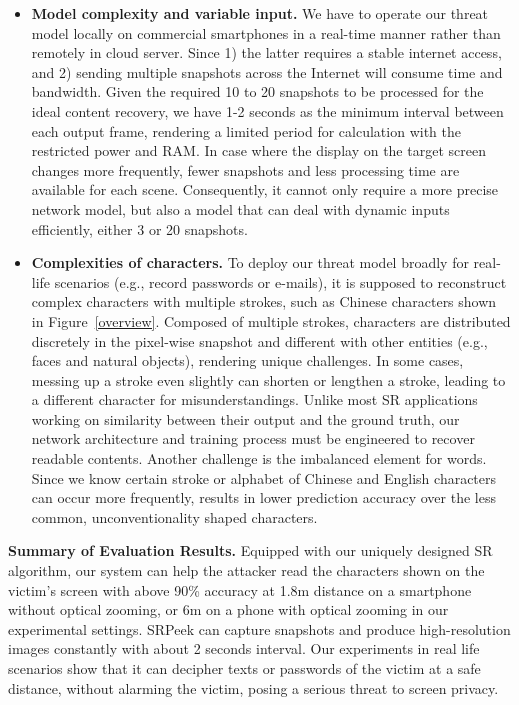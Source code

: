 \begin{itemize}
  \item \textbf{Model complexity and variable input.} We have to operate our threat model locally on commercial smartphones in a real-time manner rather than remotely in cloud server. Since 1) the latter requires a stable internet access, and 2) sending multiple snapshots across the Internet will consume time and bandwidth. Given the required 10 to 20 snapshots to be processed for the ideal content recovery, we have 1-2 seconds as the minimum interval between each output frame, rendering a limited period for calculation with the restricted power and RAM. In case where the display on the target screen changes more frequently, fewer snapshots and less processing time are available for each scene. Consequently, it cannot only require a more precise network model, but also a model that can deal with dynamic inputs efficiently, either 3 or 20 snapshots.
  \item \textbf{Complexities of characters.} To deploy our threat model broadly for real-life scenarios (e.g., record passwords or e-mails), it is supposed to reconstruct complex characters with multiple strokes, such as Chinese characters shown in Figure~\ref{overview}. Composed of multiple strokes, characters are distributed discretely in the pixel-wise snapshot and different with other entities (e.g., faces and natural objects), rendering unique challenges. In some cases, messing up a stroke even slightly can shorten or lengthen a stroke, leading to a different character for misunderstandings. Unlike most SR applications working on similarity between their output and the ground truth, our network architecture and training process must be engineered to recover readable contents. Another challenge is the imbalanced element for words. Since we know certain stroke or alphabet of Chinese and English characters can occur more frequently, results in lower prediction accuracy over the less common, unconventionality shaped characters.
\end{itemize}

\vspace{1mm}
\noindent
\textbf{Summary of Evaluation Results.}
Equipped with our uniquely designed SR algorithm, our system can help the attacker read the characters shown on the victim's screen with above 90\% accuracy at 1.8m distance on a smartphone without optical zooming, or 6m on a phone with optical zooming in our experimental settings. \textsf{SRPeek} can capture snapshots and produce high-resolution images constantly with about 2 seconds interval. Our experiments in real life scenarios show that it can decipher texts or passwords of the victim at a safe distance, without alarming the victim, posing a serious threat to screen privacy.

